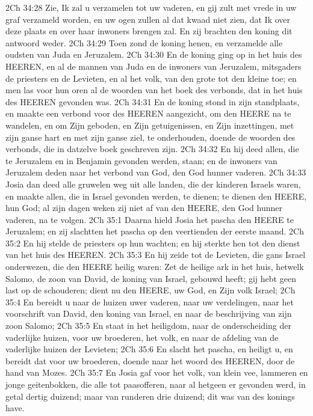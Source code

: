 2Ch 34:28  Zie, Ik zal u verzamelen tot uw vaderen, en gij zult met vrede in uw graf verzameld worden, en uw ogen zullen al dat kwaad niet zien, dat Ik over deze plaats en over haar inwoners brengen zal. En zij brachten den koning dit antwoord weder.
2Ch 34:29  Toen zond de koning henen, en verzamelde alle oudsten van Juda en Jeruzalem.
2Ch 34:30  En de koning ging op in het huis des HEEREN, en al de mannen van Juda en de inwoners van Jeruzalem, mitsgaders de priesters en de Levieten, en al het volk, van den grote tot den kleine toe; en men las voor hun oren al de woorden van het boek des verbonds, dat in het huis des HEEREN gevonden was.
2Ch 34:31  En de koning stond in zijn standplaats, en maakte een verbond voor des HEEREN aangezicht, om den HEERE na te wandelen, en om Zijn geboden, en Zijn getuigenissen, en Zijn inzettingen, met zijn ganse hart en met zijn ganse ziel, te onderhouden, doende de woorden des verbonds, die in datzelve boek geschreven zijn.
2Ch 34:32  En hij deed allen, die te Jeruzalem en in Benjamin gevonden werden, staan; en de inwoners van Jeruzalem deden naar het verbond van God, den God hunner vaderen.
2Ch 34:33  Josia dan deed alle gruwelen weg uit alle landen, die der kinderen Israels waren, en maakte allen, die in Israel gevonden werden, te dienen; te dienen den HEERE, hun God; al zijn dagen weken zij niet af van den HEERE, den God hunner vaderen, na te volgen.
2Ch 35:1  Daarna hield Josia het pascha den HEERE te Jeruzalem; en zij slachtten het pascha op den veertienden der eerste maand.
2Ch 35:2  En hij stelde de priesters op hun wachten; en hij sterkte hen tot den dienst van het huis des HEEREN.
2Ch 35:3  En hij zeide tot de Levieten, die gans Israel onderwezen, die den HEERE heilig waren: Zet de heilige ark in het huis, hetwelk Salomo, de zoon van David, de koning van Israel, gebouwd heeft; gij hebt geen last op de schouderen; dient nu den HEERE, uw God, en Zijn volk Israel;
2Ch 35:4  En bereidt u naar de huizen uwer vaderen, naar uw verdelingen, naar het voorschrift van David, den koning van Israel, en naar de beschrijving van zijn zoon Salomo;
2Ch 35:5  En staat in het heiligdom, naar de onderscheiding der vaderlijke huizen, voor uw broederen, het volk, en naar de afdeling van de vaderlijke huizen der Levieten;
2Ch 35:6  En slacht het pascha, en heiligt u, en bereidt dat voor uw broederen, doende naar het woord des HEEREN, door de hand van Mozes.
2Ch 35:7  En Josia gaf voor het volk, van klein vee, lammeren en jonge geitenbokken, die alle tot paasofferen, naar al hetgeen er gevonden werd, in getal dertig duizend; maar van runderen drie duizend; dit was van des konings have.

